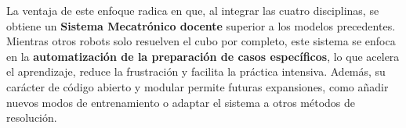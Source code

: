 La ventaja de este enfoque radica en que, al integrar las cuatro disciplinas, se obtiene un \textbf{Sistema Mecatrónico docente} superior a los modelos precedentes. Mientras otros robots solo resuelven el cubo por completo, este sistema se enfoca en la \textbf{automatización de la preparación de casos específicos}, lo que acelera el aprendizaje, reduce la frustración y facilita la práctica intensiva. Además, su carácter de código abierto y modular permite futuras expansiones, como añadir nuevos modos de entrenamiento o adaptar el sistema a otros métodos de resolución.